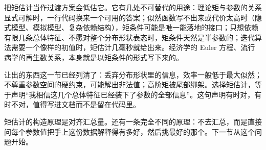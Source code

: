 把矩估计当作过渡方案会低估它。它有几处不可替代的用途：理论矩与参数的关系显式可解时，一行代码换来一个可用的答案；似然函数写不出来或代价太高时（隐式模型、模拟模型、复杂依赖结构），矩条件可能是唯一能落地的接口；只想依赖有限几条总体特征、不愿对整个分布形状表态时，矩条件天然是半参数的；迭代算法需要一个像样的初值时，矩估计几毫秒就给出来。经济学的 Euler 方程、流行病学的再生数关系，本身就是以矩条件的形式写下来的。

让出的东西这一节已经列清了：丢弃分布形状里的信息，效率一般低于最大似然；不尊重参数空间的硬约束，可能解出非法值；高阶矩被尾部绑架。选择矩估计，等于声明``我相信这几个总体特征已经装下了参数的全部信息''。这句声明有时对，有时不对，值得写进文档而不是留在代码里。

矩估计的构造原理是对齐汇总量。还有一条完全不同的原理：不去汇总，而是直接问每个参数值把手上这份数据解释得有多好，然后挑最好的那个。下一节从这个问题开始。
